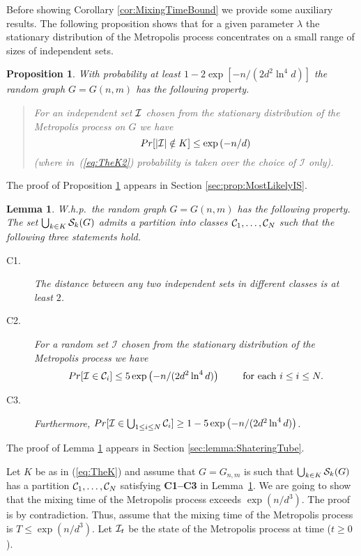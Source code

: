\documentclass[a4paper,10pt]{article}
\newtheorem{proposition}{Proposition}\renewcommand{\theproposition}{\arabic{proposition}}
\newtheorem{lemma}{Lemma}\renewcommand{\thelemma}{\arabic{lemma}}
\newcommand\cI{\mathcal{I}}
\newcommand\bc[1]{\left({#1}\right)}
\newcommand{\Whp}{W.h.p.}
\newcommand\Cor{Corollary}
\begin{document}
Before showing Corollary \ref{cor:MixingTimeBound} we provide some
auxiliary results. The following proposition shows that for a given
parameter $\lambda$ the stationary distribution of the Metropolis
process concentrates on a small range of sizes of independent sets.



\begin{proposition}\label{prop:MostLikelyIS}
With probability at least $1-2\exp\left[-n/(2d^2\ln^4d)\right]$ the
random graph $G=G(n,m)$ has the following property.
\begin{quote}
For an independent set ${\cal I}$ chosen from the stationary distribution
of the Metropolis process on $G$ we have
	\begin{equation}\label{eq:TheK2}
	Pr[|{\cal I}|\notin K]\leq \exp\left( -n/d\right)
	\end{equation}
(where in~(\ref{eq:TheK2}) probability is taken over the choice of $\cI$ only).
\end{quote}
\end{proposition}
The proof of Proposition \ref{prop:MostLikelyIS} appears in Section 
\ref{sec:prop:MostLikelyIS}.


\begin{lemma}\label{lemma:ShateringTube}
\Whp\ the random graph $G=G(n,m)$ has the following property.
The set $\bigcup_{k\in K}{\cal S}_k(G)$
admits a partition into classes ${\cal C}_1, \ldots, {\cal C}_N$ such that the following three statements hold.
\begin{description}
\item[C1.] The distance between any two independent sets in different classes is at least $2$.
\item[C2.] For a random set $\cI$ chosen from the stationary distribution of the Metropolis process we have
	$$Pr[{\cal I}\in {\cal C}_i]\leq 5\exp\left(-n/(2d^2\ln^4 d)\right)
	\qquad \mbox{ for each }i\leq i\leq N.$$
\item[C3.] Furthermore, $Pr[{\cal I} \in \bigcup_{1\leq i\leq N}{\cal C}_i]\geq 
	1-5\exp\left(-n/(2d^2\ln^4 d)\right)$. 
\end{description}
\end{lemma}
The proof of Lemma \ref{lemma:ShateringTube} appears in
Section \ref{sec:lemma:ShateringTube}.


\medskip\noindent{\bf Proof of \Cor~\ref{cor:MixingTimeBound}:}
Let $K$ be as in (\ref{eq:TheK}) and assume that $G=G_{n,m}$ is such
that $\bigcup_{k\in K}{\cal S}_k(G)$ has a partition ${\cal C}_1, \ldots, 
{\cal C}_N$ satisfying {\bf C1--C3} in
Lemma~\ref{lemma:ShateringTube}.
We are going to show that the mixing time of the Metropolis process exceeds $\exp\bc{n/d^{3}}$.
The proof is by contradiction. Thus, assume that the mixing time
of the Metropolis process is $T\leq \exp\bc{n/d^3}$.
Let ${\cal I}_t$ be the state of the Metropolis process at time ($t\geq0$).
\end{document}
